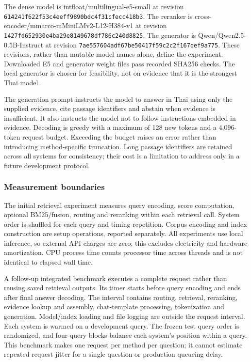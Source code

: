 The dense model is intfloat/multilingual-e5-small at revision
\texttt{614241f622f53c4eeff9890bdc4f31cfecc418b3}. The reranker is
cross-encoder/mmarco-mMiniLMv2-L12-H384-v1 at revision
\texttt{1427fd652930e4ba29e8149678df786c240d8825}. The generator is
Qwen/Qwen2.5-0.5B-Instruct at revision
\texttt{7ae557604adf67be50417f59c2c2f167def9a775}. These revisions,
rather than mutable model names alone, define the experiment. Downloaded
E5 and generator weight files pass recorded SHA256 checks. The local
generator is chosen for feasibility, not on evidence that it is the
strongest Thai model.

The generation prompt instructs the model to answer in Thai using only
the supplied evidence, cite passage identifiers and abstain when
evidence is insufficient. It also instructs the model not to follow
instructions embedded in evidence. Decoding is greedy with a maximum of
128 new tokens and a 4,096-token request budget. Exceeding the budget
raises an error rather than introducing method-specific truncation. Long
passage identifiers are retained across all systems for consistency;
their cost is a limitation to address only in a future development
protocol.

\hypertarget{measurement-boundaries}{%
\subsubsection{Measurement boundaries}\label{measurement-boundaries}}

The initial retrieval experiment measures query encoding, score
computation, optional BM25/fusion, routing and reranking within each
retrieval call. System order is shuffled for each query and timing
repetition. Corpus encoding and index construction are setup operations,
reported separately. All experiments use local inference, so external
API charges are zero; this excludes electricity and hardware
amortization. CPU process time counts processor time across threads and
is not identical to elapsed wall time.

A follow-up integrated benchmark executes a complete request rather than
reusing saved retrieval outputs. Its timer starts before query encoding
and ends after final answer decoding. The interval contains routing,
retrieval, reranking, evidence lookup and assembly, chat-template
processing, tokenization and generation. Model/index loading and file
logging are outside the request interval. Each system is warmed on a
development query. The frozen test query order is randomized, and
four-query blocks balance each system's position within a query. This
benchmark makes one request per method per question; it cannot estimate
repeated-request jitter for a single question or production queueing
delay.

